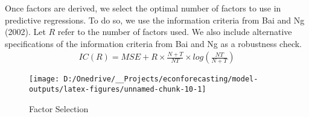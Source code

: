 \documentclass[11pt, letterpaper]{article}\usepackage[]{graphicx}\usepackage[]{color}
\begin{document}
Once factors are derived, we select the optimal number of factors to use in predictive regressions. To do so, we use the information criteria from Bai and Ng (2002). Let $R$ refer to the number of factors used. We also include alternative specifications of the information criteria from Bai and Ng as a robustness check.
\begin{align*}
	IC(R) = MSE + R \times \frac{N+T}{NT} \times log\left(\frac{NT}{N+T}\right)
\end{align*}

\begin{figure}[H]

{\centering \texttt{[image: D:/Onedrive/\_\_Projects/econforecasting/model-outputs/latex-figures/unnamed-chunk-10-1]} 

}

\caption[Factor Selection]{Factor Selection}\label{fig:unnamed-chunk-10}
\end{figure}
\end{document}
